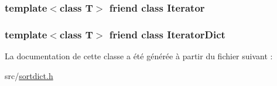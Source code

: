 \subsubsection[{Iterator}]{\setlength{\rightskip}{0pt plus 5cm}template$<$class T$>$ friend class {\bf Iterator}\hspace{0.3cm}{\ttfamily [friend]}}\label{class_s_dict_a9830fc407400559db7e7783cc10a9394}
\hypertarget{class_s_dict_ab362b5ead75b40c212098db068d50ac7}{}
\subsubsection[{Iterator\+Dict}]{\setlength{\rightskip}{0pt plus 5cm}template$<$class T$>$ friend class {\bf Iterator\+Dict}\hspace{0.3cm}{\ttfamily [friend]}}\label{class_s_dict_ab362b5ead75b40c212098db068d50ac7}


La documentation de cette classe a été générée à partir du fichier suivant \+:\begin{DoxyCompactItemize}
\item 
src/\hyperlink{sortdict_8h}{sortdict.\+h}\end{DoxyCompactItemize}
